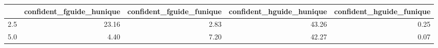 \begin{tabular}{lrrrr}
\toprule
 & confident_fguide_hunique & confident_fguide_funique & confident_hguide_hunique & confident_hguide_funique \\
\midrule
2.5 & 23.16 & 2.83 & 43.26 & 0.25 \\
5.0 & 4.40 & 7.20 & 42.27 & 0.07 \\
\bottomrule
\end{tabular}
